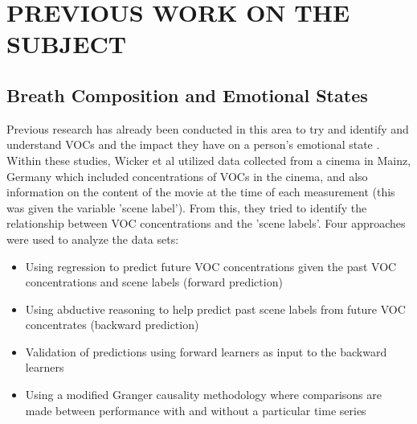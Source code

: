 \documentclass[letterpaper, 10 pt, conference]{ieeeconf}  %
\begin{document}




\section{PREVIOUS WORK ON THE SUBJECT}
\subsection{Breath Composition and Emotional States}
Previous research has already been conducted in this area to try and identify and understand VOCs and the impact they have on a person's emotional state \cite{NATURE} \cite{Wicker:2015:CDM:2783258.2783404}. Within these studies, Wicker et al utilized data collected from a cinema in Mainz, Germany which included concentrations of VOCs in the cinema, and also information on the content of the movie at the time of each measurement (this was given the variable 'scene label').  From this, they tried to identify the relationship between VOC concentrations and the 'scene labels'. Four approaches were used to analyze the data sets:
\begin{itemize}
	\item Using regression to predict future VOC concentrations given the past VOC concentrations and scene labels (forward prediction)
	\item Using abductive reasoning to help predict past scene labels from future VOC concentrates (backward prediction)
    \item Validation of predictions using forward learners as input to the backward learners
    \item Using a modified Granger causality methodology where comparisons are made between performance with and without a particular time series
\end{itemize}
\end{document}
